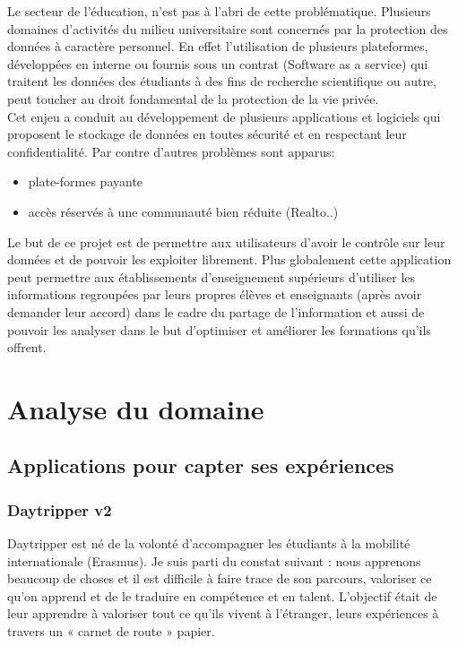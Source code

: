 \documentclass{report}
\begin{document}
Le secteur de l'éducation, n'est pas à l'abri de cette problématique. Plusieurs domaines d'activités du milieu universitaire sont concernés par la protection des données à caractère personnel. En effet l'utilisation de plusieurs plateformes, développées en interne ou fournis sous un contrat (Software as a service) qui traitent les données des étudiants à des fins de recherche scientifique ou autre, peut toucher au droit fondamental de la protection de la vie privée.
\\ 

Cet enjeu a conduit au développement de plusieurs applications et logiciels qui proposent le stockage de données en toutes sécurité et en respectant leur confidentialité. Par contre d'autres problèmes sont apparus:   
\begin{itemize}
    \item plate-formes payante
    \item accès réservés à une communauté bien réduite (Realto..)
\end{itemize}

Le but de ce projet est de permettre aux utilisateurs d'avoir le contrôle sur leur données et de pouvoir les exploiter librement.  Plus globalement cette application peut permettre aux établissements d'enseignement supérieurs d'utiliser les informations regroupées par leurs propres élèves et enseignants (après avoir demander leur accord) dans le cadre du partage de l'information et aussi de pouvoir les analyser dans le but d'optimiser et améliorer les formations qu'ils offrent.

\chapter{Analyse du domaine}


\section{Applications pour capter ses expériences}
\subsection{Daytripper v2}
\og Daytripper est né de la volonté d’accompagner les étudiants à la mobilité internationale (Erasmus). Je suis parti du constat suivant : nous apprenons beaucoup de choses et il est difficile à faire trace de son parcours, valoriser ce qu’on apprend et de le traduire en compétence et en talent. L’objectif était de leur apprendre à valoriser tout ce qu’ils vivent à l’étranger, leurs expériences à travers un « carnet de route » papier. \fg \cite{ref6}
\\
\end{document}
